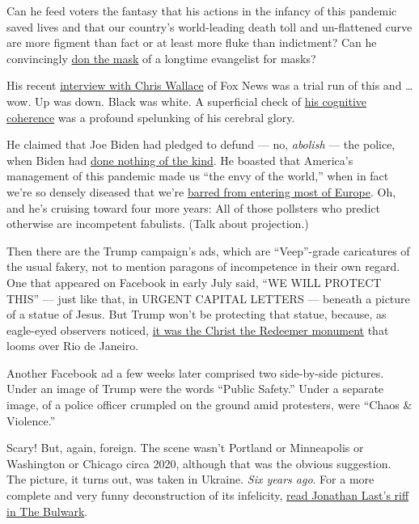 Can he feed voters the fantasy that his actions in the infancy of this
pandemic saved lives and that our country's world-leading death toll and
un-flattened curve are more figment than fact or at least more fluke
than indictment? Can he convincingly
\href{https://www.newsweek.com/donald-trump-mask-timeline-avoid-patriotic-1519300}{don
the mask} of a longtime evangelist for masks?

His recent
\href{https://nymag.com/intelligencer/2020/07/trump-interview-chris-wallace-cognitive-dementia-fox-news.html}{interview
with Chris Wallace} of Fox News was a trial run of this and \ldots{}
wow. Up was down. Black was white. A superficial check of
\href{https://www.washingtonpost.com/politics/trump-bragging-cognitive-test-dementia/2020/07/22/6578e826-cb65-11ea-91f1-28aca4d833a0_story.html}{his
cognitive coherence} was a profound spelunking of his cerebral glory.

He claimed that Joe Biden had pledged to defund --- no, \emph{abolish}
--- the police, when Biden had
\href{https://www.factcheck.org/2020/07/trumps-false-recurring-claim-about-bidens-stance-on-police/}{done
nothing of the kind}. He boasted that America's management of this
pandemic made us ``the envy of the world,'' when in fact we're so
densely diseased that we're
\href{https://www.nytimes.com/article/eu-travel-ban-explained-usa.html}{barred
from entering most of Europe}. Oh, and he's cruising toward four more
years: All of those pollsters who predict otherwise are incompetent
fabulists. (Talk about projection.)

Then there are the Trump campaign's ads, which are ``Veep''-grade
caricatures of the usual fakery, not to mention paragons of incompetence
in their own regard. One that appeared on Facebook in early July said,
``WE WILL PROTECT THIS'' --- just like that, in URGENT CAPITAL LETTERS
--- beneath a picture of a statue of Jesus. But Trump won't be
protecting that statue, because, as eagle-eyed observers noticed,
\href{https://www.thedailybeast.com/trump-camp-vows-to-protect-brazils-most-iconic-statue-from-left-wing-mobs}{it
was the Christ the Redeemer monument} that looms over Rio de Janeiro.

Another Facebook ad a few weeks later comprised two side-by-side
pictures. Under an image of Trump were the words ``Public Safety.''
Under a separate image, of a police officer crumpled on the ground amid
protesters, were ``Chaos \& Violence.''

Scary! But, again, foreign. The scene wasn't Portland or Minneapolis or
Washington or Chicago circa 2020, although that was the obvious
suggestion. The picture, it turns out, was taken in Ukraine. \emph{Six
years ago}. For a more complete and very funny deconstruction of its
infelicity, \href{https://thebulwark.com/trumps-new-ad-is-amazing/}{read
Jonathan Last's riff in The Bulwark}.


